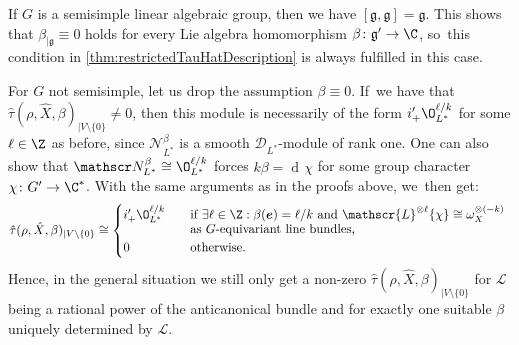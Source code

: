 \documentclass[JEP,XML,SOM,Unicode,published]{cedram}
\newcommand{\bme}{{\boldsymbol{e}}}
\newcommand{\Ell}{\mathscr{L}}
\newcommand{\frg}{\mathfrak{g}}
\DeclareMathOperator{\differential}{d\!}
\newcommand\restr[2]{{#1_{| {#2}}}}
\begin{document}
\begin{rmk}
If $G$ is a semisimple linear algebraic group, then we have $[\frg, \frg] = \frg$. This shows that $\restr{\beta}{\frg} \equiv 0$ holds for every Lie algebra homomorphism $\beta \colon \frg' \to \C$, so~this condition in \cref{thm:restrictedTauHatDescription} is always fulfilled in this case.
\end{rmk}

\begin{rmk}
For $G$ not semisimple, let us drop the assumption $\beta \equiv 0$. If~we have that $\restr{\hat{\tau}(\rho,\hat X, \beta)}{V \setminus \{0\}} \neq 0$,
then this module is necessarily of the form $i'_+\O_{L^*}^{\ell/k}$ for some $\ell \in \Z$ as before, since $\mathscr N_{L^*}^\beta$ is a smooth $\mathscr D_{L^*}$\nobreakdash-mod\-ule of rank one.
One can also show that $\mathscr N_{L^*}^\beta \cong \O_{L^*}^{\ell/k}$ forces $k\beta = \differential \chi$ for some group character $\chi \colon G' \to \C^*$.
With the same arguments as in the proofs above, we~then get:
\[
\restr{\hat{\tau}(\rho, \hat{X}, \beta)}{V \setminus \{0\}} \cong
\begin{cases}
i'_+ \O_{L^*}^{\ell/k} & \quad\text{if $\exists \ell \in \Z: \beta(\bme) = \ell/k$ and $\Ell^{\otimes \ell}\{\chi\} \cong \omega_X^{\otimes (-k)}$ } \\[-3pt]
& \quad\text{as $G$-equivariant line bundles,} \\
0 & \quad\text{otherwise.}
\end{cases}
\]
Hence, in the general situation we still only get a non-zero $\restr{\hat\tau(\rho, \hat X, \beta)}{V \setminus \{0\}}$ for $\Ell$ being a rational power of the anticanonical bundle and for exactly one suitable $\beta$ uniquely determined by $\Ell$.
\end{rmk}
\end{document}
